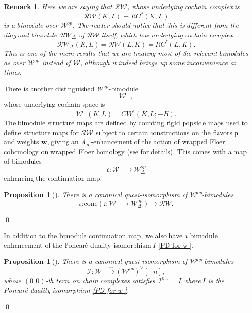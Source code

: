 \documentclass[11pt]{amsproc}
\def\w{\mathcal{W}(E)}
\def\w{\mathcal{W}}
\def\rw{\mathcal{RW}}
\def\D{\Delta}
\def\ainf{A_\infty}
\def\cone{\mathrm{cone}}
\def\ck{\mathfrak{c}}
\newtheorem{prop}[lem]{Proposition}
\newtheorem{rem}[lem]{Remark}
\theoremstyle{remark}
\numberwithin{equation}{section}
\begin{document}
\begin{rem}
Here we are saying that $\rw$, whose underlying cochain complex is
\begin{equation}
\rw(K, L) = RC^{*}(K, L)
\end{equation}
is a bimodule over $\w^{op}$.
The reader should notice that this is different from the diagonal bimodule $\rw_{\D}$ of $\rw$ itself, 
which has underlying cochain complex 
\begin{equation}
\rw_{\D}(K, L) = \rw(L, K) = RC^{*}(L, K).
\end{equation}
This is one of the main results that we are treating most of the relevant bimodules as over $\w^{op}$ instead of $\w$,
although it indeed brings up some inconvenience at times.
\end{rem}

There is another distinguished $\w^{op}$-bimodule
\begin{equation}
\w_{-},
\end{equation}
whose underlying cochain space is
\begin{equation}
\w_{-}(K, L) = CW^{*}(K, L; -H).
\end{equation}
The bimodule structure maps are defined by counting rigid popsicle maps used to define structure maps for $\rw$ subject to certain constructions on the flavors $\mathbf{p}$ and weights $\mathbf{w}$,
giving an $\ainf$-enhancement of the action of wrapped Floer cohomology on wrapped Floer homology
(see \cite[\S 5.6]{GGV} for details).
This comes with a map of bimodules
\begin{equation}\label{bimodule continuation map}
\ck: \w_{-} \to \w^{op}_{\D}
\end{equation} 
enhancing the continuation map.

\begin{prop}[{\cite[Lemma 5.9]{GGV}}]\label{prop: rw as cone of bimodule}
There is a canonical quasi-isomorphism of $\w^{op}$-bimodules
\begin{equation}
\iota: \cone(\ck: \w_{-} \to \w^{op}_{\D}) \to \rw.
\end{equation}
\end{prop} \qed

In addition to the bimodule continuation map, we also have a bimodule enhancement of the Poncar\'{e} duality isomorphism $I$ \eqref{PD for w-}.

\begin{prop}[{\cite[Proposition 5.11]{GGV}}]\label{prop: bimodule PD}
There is a canonical quasi-isomorphism of $\w^{op}$-bimodules
\begin{equation}\label{bimodule PD}
\mathcal{I}: \w_{-} \stackrel{\sim}\to (\w^{op})^{\vee}[-n],
\end{equation}
whose $(0,0)$-th term on chain complexes satisfies $\mathcal{I}^{0, 0} = I$ where $I$ is the Poncar\'{e} duality isomorphism \eqref{PD for w-}. 
\end{prop} \qed
\end{document}
